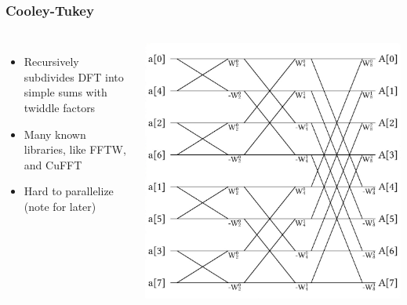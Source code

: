 \documentclass{beamer}
\begin{document}
\begin{frame}
\frametitle{Cooley-Tukey}

\begin{columns}
\begin{itemize}
\item Recursively subdivides DFT into simple sums with twiddle factors
\item Many known libraries, like FFTW, and CuFFT
\item Hard to parallelize (note for later)
\end{itemize}
\includegraphics[width=\textwidth]{radix-8screen.jpg}
\end{columns}
\end{frame}
\end{document}
